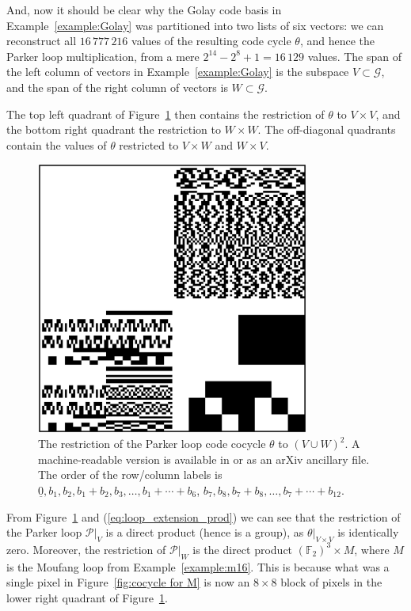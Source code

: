 \documentclass{article}
\theoremstyle{plain}
\theoremstyle{definition}
\def \cG {\mathcal{G}}
\def \cP {\mathcal{P}}
\def \FF {\mathbb{F}}
\begin{document}
And, now it should be clear why the Golay code basis in Example~\ref{example:Golay} was partitioned into two lists of six vectors: we can reconstruct all $16\,777\,216$ values of the resulting code cycle $\theta$, and hence the Parker loop multiplication, from a mere $2^{14} - 2^8 + 1 = 16\,129$ values.
The span of the left column of vectors in Example~\ref{example:Golay} is the subspace $V\subset \cG$, and the span of the right column of vectors is $W\subset \cG$.

The top left quadrant of Figure~\ref{fig:Parker cocycle} then contains the restriction of $\theta$ to $V\times V$, and the bottom right quadrant the restriction to $W\times W$. 
The off-diagonal quadrants contain the values of $\theta$ restricted to $V\times W$ and $W\times V$.

\begin{figure}[ht]
\begin{center}
\includegraphics[width=0.8\textwidth]{alpha_awesum.png}
\end{center}
\caption{The restriction of the Parker loop code cocycle $\theta$ to $(V\cup W)^2$. A machine-readable version is available in \cite{RN_GH} or as an arXiv ancillary file. The order of the row/column labels is $\underline{0},b_1,b_2,b_1+b_2,b_3,\ldots, b_1+\cdots +b_6$, $b_7,b_8,b_7+b_8,\ldots,b_7+\cdots + b_{12}$.}
\label{fig:Parker cocycle}
\end{figure}

From Figure~\ref{fig:Parker cocycle} and (\ref{eq:loop_extension_prod}) we can see that the restriction of the Parker loop $\cP\big|_V$ is a direct product (hence is a group), as $\theta\big|_{V\times V}$ is identically zero. 
Moreover, the restriction of $\cP\big|_W$ is the direct product $(\FF_2)^3 \times M$, where $M$ is the Moufang loop from Example~\ref{example:m16}.
This is because what was a single pixel in Figure~\ref{fig:cocycle for M} is now an $8\times 8$ block of pixels in the lower right quadrant of Figure~\ref{fig:Parker cocycle}.
\end{document}

